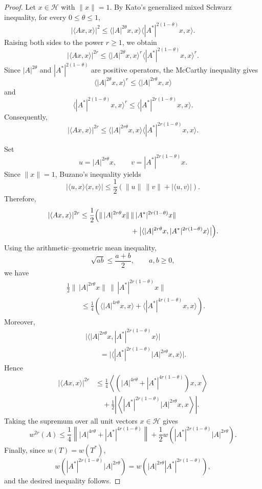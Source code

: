 \documentclass[final,1p,times]{elsarticle}
\begin{document}
\begin{proof}
Let $x\in\mathcal{H}$ with $\|x\|=1$. By Kato's generalized
mixed Schwarz inequality, for every $0\leq\theta\leq1$,
\[
|\langle Ax,x\rangle|^2
\leq
\langle |A|^{2\theta}x,x\rangle
\langle |A^*|^{2(1-\theta)}x,x\rangle.
\]
Raising both sides to the power $r\geq1$, we obtain
\[
|\langle Ax,x\rangle|^{2r}
\leq
\langle |A|^{2\theta}x,x\rangle^r
\langle |A^*|^{2(1-\theta)}x,x\rangle^r.
\]
Since $|A|^{2\theta}$ and $|A^*|^{2(1-\theta)}$ are positive
operators, the McCarthy inequality gives
\[
\langle |A|^{2\theta}x,x\rangle^r
\leq
\langle |A|^{2r\theta}x,x\rangle
\]
and
\[
\langle |A^*|^{2(1-\theta)}x,x\rangle^r
\leq
\langle |A^*|^{2r(1-\theta)}x,x\rangle.
\]
Consequently,
\[
|\langle Ax,x\rangle|^{2r}
\leq
\langle |A|^{2r\theta}x,x\rangle
\langle |A^*|^{2r(1-\theta)}x,x\rangle.
\]

Set
\[
u=|A|^{2r\theta}x,
\qquad
v=|A^*|^{2r(1-\theta)}x.
\]
Since $\|x\|=1$, Buzano's inequality yields
\[
|\langle u,x\rangle\langle x,v\rangle|
\leq
\frac12
\left(
\|u\|\,\|v\|
+
|\langle u,v\rangle|
\right).
\]
Therefore,
\[
\begin{aligned}
|\langle Ax,x\rangle|^{2r}
&\leq
\frac12
\Big(
\|\,|A|^{2r\theta}x\|
\,
\|\,|A^*|^{2r(1-\theta)}x\|
\\
&\hspace{2.5cm}
+
\big|
\langle
|A|^{2r\theta}x,
|A^*|^{2r(1-\theta)}x
\rangle
\big|
\Big).
\end{aligned}
\]
Using the arithmetic--geometric mean inequality,
\[
\sqrt{ab}\leq\frac{a+b}{2},
\qquad a,b\geq0,
\]
we have
\[
\begin{aligned}
&\frac12
\|\,|A|^{2r\theta}x\|
\,
\|\,|A^*|^{2r(1-\theta)}x\|
\\
&\qquad\leq
\frac14
\left(
\langle |A|^{4r\theta}x,x\rangle
+
\langle |A^*|^{4r(1-\theta)}x,x\rangle
\right).
\end{aligned}
\]
Moreover,
\[
\begin{aligned}
&
\big|
\langle
|A|^{2r\theta}x,
|A^*|^{2r(1-\theta)}x
\rangle
\big|
\\
&\qquad=
\big|
\langle
|A^*|^{2r(1-\theta)}
|A|^{2r\theta}x,x
\rangle
\big|.
\end{aligned}
\]
Hence
\[
\begin{aligned}
|\langle Ax,x\rangle|^{2r}
&\leq
\frac14
\left\langle
\left(
|A|^{4r\theta}
+
|A^*|^{4r(1-\theta)}
\right)x,x
\right\rangle
\\
&\quad+
\frac12
\left|
\left\langle
|A^*|^{2r(1-\theta)}
|A|^{2r\theta}x,x
\right\rangle
\right|.
\end{aligned}
\]
Taking the supremum over all unit vectors $x\in\mathcal{H}$ gives
\[
w^{2r}(A)
\leq
\frac14
\left\|
|A|^{4r\theta}
+
|A^*|^{4r(1-\theta)}
\right\|
+
\frac12
w\!\left(
|A^*|^{2r(1-\theta)}
|A|^{2r\theta}
\right).
\]
Finally, since $w(T)=w(T^*)$,
\[
w\!\left(
|A^*|^{2r(1-\theta)}
|A|^{2r\theta}
\right)
=
w\!\left(
|A|^{2r\theta}
|A^*|^{2r(1-\theta)}
\right),
\]
and the desired inequality follows.
\end{proof}
\medskip
\end{document}
